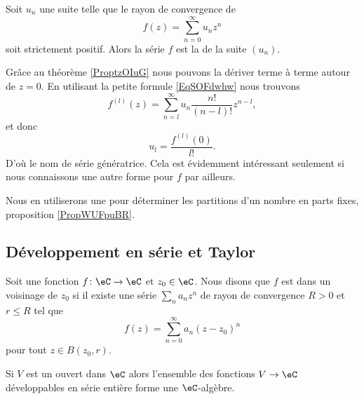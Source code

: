 Soit \( u_n\) une suite telle que le rayon de convergence de
\begin{equation}
    f(z)=\sum_{n=0}^{\infty}u_nz^n
\end{equation}
soit strictement positif. Alors la série \( f\) est la  de la suite \( (u_n)\).

Grâce au théorème \ref{ProptzOIuG} nous pouvons la dériver terme à terme autour de \( z=0\). En utilisant la petite formule \eqref{EqSOFdwhw} nous trouvons
\begin{equation}    \label{EqNGhVCpP}
    f^{(l)}(z)=\sum_{n=l}^{\infty}u_n\frac{ n! }{ (n-l)! }z^{n-l},
\end{equation}
et donc
\begin{equation}
    u_l=\frac{ f^{(l)}(0) }{ l! }.
\end{equation}
D'où le nom de série génératrice. Cela est évidemment intéressant seulement si nous connaissons une autre forme pour \( f\) par ailleurs. 

Nous en utiliserons une pour déterminer les partitions d'un nombre en parts fixes, proposition \ref{PropWUFpuBR}.

\subsection{Développement en série et Taylor}

\begin{definition}  \label{DefwmRzKh}
    Soit une fonction \( f\colon \eC\to \eC\) et \( z_0\in \eC\). Nous disons que \( f\) est  dans un voisinage de \( z_0\) si il existe une série \( \sum_n a_nz^n\) de rayon de convergence \( R>0\) et \( r\leq R\) tel que
    \begin{equation}
        f(z)=\sum_{n=0}^{\infty}a_n(z-z_0)^n
    \end{equation}
    pour tout \( z\in B(z_0,r)\).
\end{definition}

\begin{proposition}
    Si \( V\) est un ouvert dans \( \eC\) alors l'ensemble des fonctions \( V\to \eC\) développables en série entière forme une \( \eC\)-algèbre.
\end{proposition}


